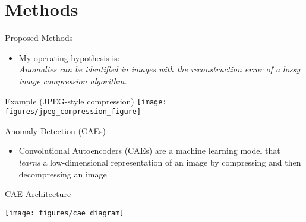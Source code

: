\documentclass[10pt]{beamer}
\begin{document}
\section{Methods}

\begin{frame}{Proposed Methods}
\begin{itemize}

\item My operating hypothesis is:\\ 
\alert{\textit{Anomalies can be identified in images with the reconstruction error of a lossy image compression algorithm.}}\\[0.5cm]
\end{itemize}


\begin{exampleblock}{Example (JPEG-style compression)}
\texttt{[image: figures/jpeg\_compression\_figure]}

\end{exampleblock}


\end{frame}

%
%
%
%
%
%
%

\begin{frame}{Anomaly Detection (CAEs)}

\begin{itemize}
\item Convolutional Autoencoders (CAEs) are a machine learning model that \textit{learns} a low-dimensional representation of an image by compressing and then decompressing an image \cite{wta_detection, attention_anomalies}.\\[0.5cm]
\end{itemize}

\begin{exampleblock}{CAE Architecture}
\begin{center}
\texttt{[image: figures/cae\_diagram]}
\end{center}
\end{exampleblock}

\end{frame}
\end{document}
